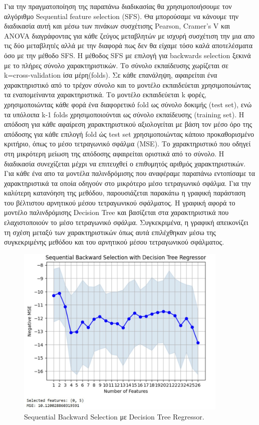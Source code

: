 \documentclass[12pt]{article}
\begin{document}
 Για την πραγματοποίηση της παραπάνω διαδικασίας θα χρησιμοποιήσουμε τον αλγόριθμο Sequential feature selection (SFS). Θα μπορούσαμε να κάνουμε την διαδικασία αυτή και μέσω των πινάκων συσχέτισης Pearson, Cramer's V και ANOVA διαγράφοντας για κάθε ζεύγος μεταβλητών με ισχυρή συσχέτιση την μια απο τις δύο μεταβλητές αλλά με την διαφορά πως δεν θα είχαμε τόσο καλά αποτελέσματα όσο με την μέθοδο SFS. Η μέθοδος SFS με επιλογή για backwards selection ξεκινά με το πλήρες σύνολο χαρακτηριστικών. Το σύνολο εκπαίδευσης χωρίζεται σε k=cross-validation ίσα μέρη(folds). Σε κάθε επανάληψη, αφαιρείται ένα χαρακτηριστικό από το τρέχον σύνολο και το μοντέλο εκπαιδεύεται χρησιμοποιώντας τα εναπομείναντα χαρακτηριστικά. Το μοντέλο εκπαιδεύεται k φορές, χρησιμοποιώντας κάθε φορά ένα διαφορετικό fold ως σύνολο δοκιμής (test set), ενώ τα υπόλοιπα k-1 folds χρησιμοποιούνται ως σύνολο εκπαίδευσης (training set). Η απόδοση για κάθε αφαίρεση χαρακτηριστικού αξιολογείται με βάση τον μέσο όρο της απόδοσης για κάθε επιλογή fold ώς test set χρησιμοποιώντας κάποιο προκαθορισμένο κριτήριο, όπως το μέσο τετραγωνικό σφάλμα (MSE). Το χαρακτηριστικό που οδηγεί στη μικρότερη μείωση της απόδοσης αφαιρείται οριστικά από το σύνολο. Η διαδικασία συνεχίζεται μέχρι να επιτευχθεί ο επιθυμητός αριθμός χαρακτηριστικών. Για κάθε ένα απο τα μοντέλα παλινδρόμισης που αναφέραμε παραπάνω εντοπίσαμε τα χαρακτηριστικά τα οποία οδηγούν στο μικρότερο μέσο τετραγωνικό σφάλμα. Για την καλύτερη κατανόηση της μεθόδου, παρουσιάζεται παρακάτω η γραφική παράσταση του βέλτιστου αρνητικού μέσου τετραγωνικού σφάλματος. Η γραφική αφορά το μοντέλο παλινδρόμισης Decision Tree και βασίζεται στα χαρακτηριστικά που ελαχιστοποιούν το μέσο τετραγωνικό σφάλμα. Συγκεκριμένα, η γραφική απεικονίζει τη σχέση μεταξύ των χαρακτηριστικών όπως αυτά επιλέχθηκαν μέσω της συγκεκριμένης μεθόδου και του αρνητικού μέσου τετραγωνικού σφάλματος.

\begin{figure}
    \centering 
   \includegraphics[width=0.9\textwidth]{./images/icon8.jpg}
    \caption{Sequential Backward Selection με Decision Tree Regressor.}
    \label{fig:BackwardSelection} 
    
\end{figure}
\end{document}
